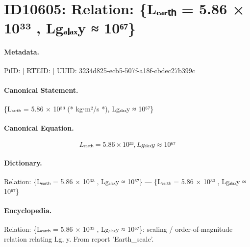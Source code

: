 \section*{ID10605: Relation: \{Lₑₐᵣₜₕ = 5.86 × 10³³ , Lgₐₗₐₓy ≈ 10⁶⁷\}}
\paragraph{Metadata.}
PiID:  | RTEID:  | UUID: 3234d825-ecb5-507f-a18f-cbdec27b399c

\paragraph{Canonical Statement.}
\{Lₑₐᵣₜₕ = 5.86 × 10³³ (* kg⋅m²/s *), Lgₐₗₐₓy ≈ 10⁶⁷\}

\paragraph{Canonical Equation.}
\[
{Lₑₐᵣₜₕ = 5.86 × 10³³ , Lgₐₗₐₓy ≈ 10⁶⁷}
\]

\paragraph{Dictionary.}
Relation: \{Lₑₐᵣₜₕ = 5.86 × 10³³ , Lgₐₗₐₓy ≈ 10⁶⁷\} — \{Lₑₐᵣₜₕ = 5.86 × 10³³ , Lgₐₗₐₓy ≈ 10⁶⁷\}

\paragraph{Encyclopedia.}
Relation: \{Lₑₐᵣₜₕ = 5.86 × 10³³ , Lgₐₗₐₓy ≈ 10⁶⁷\}: scaling / order-of-magnitude relation relating Lg, y. From report 'Earth\_scale'.
